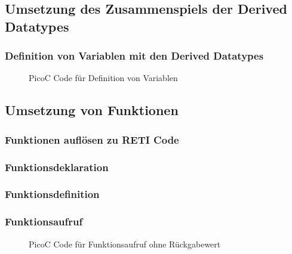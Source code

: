 \subsection{Umsetzung des Zusammenspiels der Derived Datatypes}
\subsubsection{Definition von Variablen mit den Derived Datatypes}
\begin{figure}[H]
  \centering
  \caption{PicoC Code für Definition von Variablen}
  \label{fig:picoc_code_für_definition_von_variablen}
\end{figure}

{
  \centering
  \label{fig:symboltabelle_für_definition_von_variablen}

}

\subsection{Umsetzung von Funktionen}
\subsubsection{Funktionen auflösen zu RETI Code}
\subsubsection{Funktionsdeklaration}
\subsubsection{Funktionsdefinition}
\subsubsection{Funktionsaufruf}
\begin{figure}[H]
  \centering
  \caption{PicoC Code für Funktionsaufruf ohne Rückgabewert}
  \label{fig:picoc_code_für_funktionsaufruf_ohne_rückgabewert}
\end{figure}

